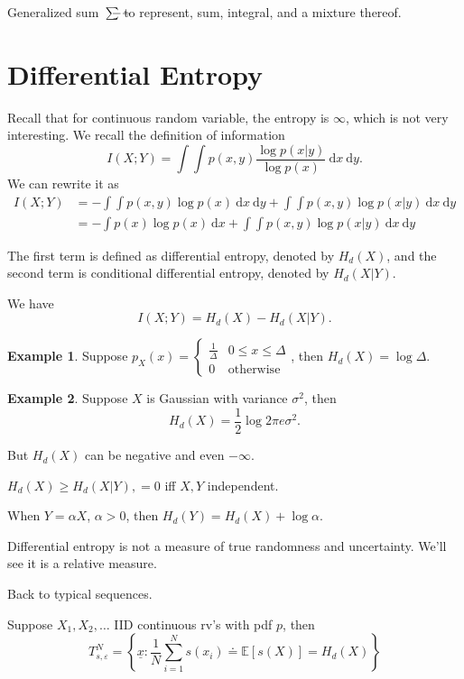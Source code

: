 \documentclass{report}
\newcommand{\idf}{\ \mathrm{d}}
\newcommand{\set}[1]{\left\lbrace #1 \right\rbrace}
\def \ssumsym {\mathrlap{\ \ --}\sum}
\DeclareMathOperator*{\ssum}{\ssumsym}
\theoremstyle{definition}
\newtheorem{example}{Example}[section]
\theoremstyle{remark}
\numberwithin{equation}{section}
\begin{document}
Generalized sum $\ssum$ to represent, sum, integral, and a mixture thereof.

\section{Differential Entropy}
Recall that for continuous random variable, the entropy is $\infty$, which is not very interesting. We recall the definition of information \[I(X;Y) = \int\int p(x, y)\frac{\log p(x|y)}{\log p(x)} \idf x \idf y.\]
We can rewrite it as \begin{align*}
  I(X;Y) & = -\int\int p(x, y){\log p(x)} \idf x \idf y + \int\int p(x, y)\log p(x|y) \idf x \idf y \\
  & = -\int p(x){\log p(x)} \idf x + \int\int p(x, y)\log p(x|y) \idf x \idf y
\end{align*}
  
The first term is defined as differential entropy, denoted by $H_d(X)$, and the second term is conditional differential entropy, denoted by $H_d(X|Y)$.

We have \[I(X; Y) = H_d(X) - H_d(X|Y).\]

\begin{example}
  Suppose $p_X(x) = \begin{cases}
    \frac{1}{\Delta} & 0 \leq x \leq \Delta \\
    0 & \text{otherwise}  
  \end{cases}$, then $H_d(X) = \log \Delta$.
\end{example}

\begin{example}
  Suppose $X$ is Gaussian with variance $\sigma^2$, then \[H_d(X) = \frac{1}{2}\log 2\pi e\sigma^2.\]
\end{example}

But $H_d(X)$ can be negative and even $-\infty$.

$H_d(X) \geq H_d(X|Y), = 0$ iff $X, Y$ independent.

When $Y = \alpha X$, $\alpha > 0$, then $H_d(Y) = H_d(X) + \log \alpha$.

Differential entropy is not a measure of true randomness and uncertainty. We'll see it is a relative measure.

Back to typical sequences.

Suppose $X_1, X_2, \ldots$ IID continuous rv's with pdf $p$, then \[
T_{s,\varepsilon}^N = \set{\underline{x}: \frac{1}{N}\sum_{i=1}^N s(x_i) \doteq \mathbb E [s(X)] = H_d(X)}  
\]
\end{document}
